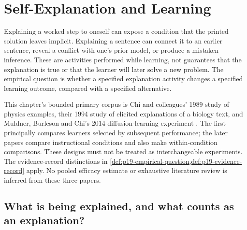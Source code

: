 \chapter{Self-Explanation and Learning}
\label{sec:p19-self-explanation-and-learning}

Explaining a worked step to oneself can expose a condition that the printed
solution leaves implicit. Explaining a sentence can connect it to an earlier
sentence, reveal a conflict with one's prior model, or produce a mistaken
inference. These are activities performed while learning, not guarantees
that the explanation is true or that the learner will later solve a new
problem. The empirical question is whether a specified explanation activity
changes a specified learning outcome, compared with a specified alternative.

This chapter's bounded primary corpus is Chi and colleagues' 1989 study of
physics examples, their 1994 study of elicited explanations of a biology
text, and Muldner, Burleson and Chi's 2014 diffusion-learning experiment
\cite{ChiEtAl1989SelfExplanations,ChiEtAl1994Eliciting,
MuldnerBurlesonChi2014Emergent}. The first principally compares learners
selected by subsequent performance; the later papers compare instructional
conditions and also make within-condition comparisons. These designs must
not be treated as interchangeable experiments. The evidence-record
distinctions in \cref{def:p19-empirical-question,def:p19-evidence-record}
apply. No pooled efficacy estimate or exhaustive literature review is
inferred from these three papers.

\section{What is being explained, and what counts as an explanation?}
\label{sec:p19-self-explanation-task}

